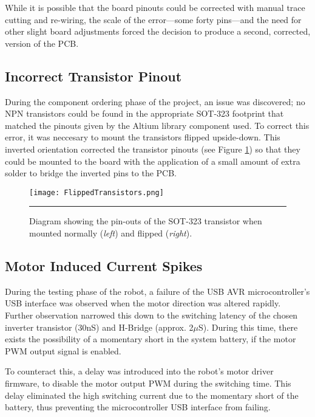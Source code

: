 While it is possible that the board pinouts could be corrected with manual trace cutting and re-wiring, the scale of the error---some forty pins---and the need for other slight board adjustments forced the decision to produce a second, corrected, version of the PCB.

\subsection{Incorrect Transistor Pinout}

During the component ordering phase of the project, an issue was discovered; no NPN transistors could be found in the appropriate SOT-323 footprint that matched the pinouts given by the Altium library component used. To correct this error, it was neccesary to mount the transistors flipped upside-down. This inverted orientation corrected the transistor pinouts (see Figure \ref{fig:flippedtransistor}) so that they could be mounted to the board with the application of a small amount of extra solder to bridge the inverted pins to the PCB.

\begin{figure}[H]
	\centering
		\texttt{[image: FlippedTransistors.png]}
	\rule{35em}{0.5pt}
	\caption[Diagram of the normal and flipped SOT-323 Transistor]{Diagram showing the pin-outs of the SOT-323 transistor when mounted normally (\textit{left}) and flipped (\textit{right}).}
	\label{fig:flippedtransistor}
\end{figure}

\subsection{Motor Induced Current Spikes}

During the testing phase of the robot, a failure of the USB AVR microcontroller's USB interface was observed when the motor direction was altered rapidly. Further observation narrowed this down to the switching latency of the chosen inverter transistor (30nS) and H-Bridge (approx. 2$\mu$S). During this time, there exists the possibility of a momentary short in the system battery, if the motor PWM output signal is enabled.

To counteract this, a delay was introduced into the robot's motor driver firmware, to disable the motor output PWM during the switching time. This delay eliminated the high switching current due to the momentary short of the battery, thus preventing the microcontroller USB interface from failing.

